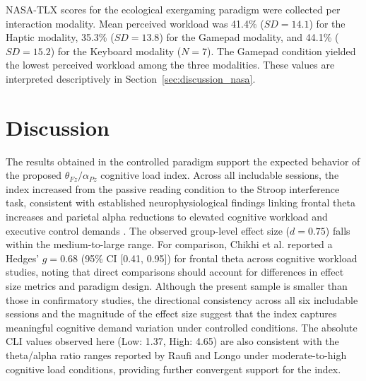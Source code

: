 \documentclass[10pt]{iopart}
\begin{document}
NASA-TLX scores for the ecological exergaming paradigm were
collected per interaction modality. Mean perceived workload was
41.4\% ($SD = 14.1$) for the Haptic modality, 35.3\%
($SD = 13.8$) for the Gamepad modality, and 44.1\%
($SD = 15.2$) for the Keyboard modality ($N = 7$). The Gamepad
condition yielded the lowest perceived workload among the three
modalities. These values are interpreted descriptively in
Section~\ref{sec:discussion_nasa}.

\section{Discussion}

The results obtained in the controlled paradigm support the
expected behavior of the proposed $\theta_{Fz}/\alpha_{Pz}$
cognitive load index. Across all includable sessions, the index
increased from the passive reading condition to the Stroop
interference task, consistent with established neurophysiological
findings linking frontal theta increases and parietal alpha
reductions to elevated cognitive workload and executive control
demands \cite{c1,c4,c5,Nigbur2011_ThetaCognitiveInterference}.
The observed group-level effect size ($d = 0.75$) falls within
the medium-to-large range. For comparison, Chikhi et al.
\cite{c4} reported a Hedges' $g = 0.68$ (95\% CI [0.41, 0.95])
for frontal theta across cognitive workload studies, noting that
direct comparisons should account for differences in effect size
metrics and paradigm design. Although the present sample is
smaller than those in confirmatory studies, the directional
consistency across all six includable sessions and the magnitude
of the effect size suggest that the index captures meaningful
cognitive demand variation under controlled conditions. The
absolute CLI values observed here (Low: 1.37, High: 4.65) are
also consistent with the theta/alpha ratio ranges reported by
Raufi and Longo \cite{c1} under moderate-to-high cognitive load
conditions, providing further convergent support for the index.
\end{document}
